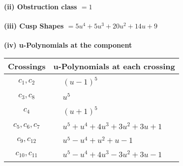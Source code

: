 \documentclass[1p]{elsarticle_modified}
\theoremstyle{definition}
\begin{document}
\flushleft \textbf{(ii) Obstruction class $= 1$}\\~\\
\flushleft \textbf{(iii) Cusp Shapes $= 5 u^4+5 u^3+20 u^2+14 u+9$}\\~\\
\newpage\renewcommand{\arraystretch}{1}
\flushleft \textbf{(iv) u-Polynomials at the component}\newline \\
\begin{tabular}{m{50pt}|m{274pt}}
Crossings & \hspace{64pt}u-Polynomials at each crossing \\
\hline $$\begin{aligned}c_{1},c_{2}\end{aligned}$$&$\begin{aligned}
&(u-1)^5
\end{aligned}$\\
\hline $$\begin{aligned}c_{3},c_{8}\end{aligned}$$&$\begin{aligned}
&u^5
\end{aligned}$\\
\hline $$\begin{aligned}c_{4}\end{aligned}$$&$\begin{aligned}
&(u+1)^5
\end{aligned}$\\
\hline $$\begin{aligned}c_{5},c_{6},c_{7}\end{aligned}$$&$\begin{aligned}
&u^5+u^4+4 u^3+3 u^2+3 u+1
\end{aligned}$\\
\hline $$\begin{aligned}c_{9},c_{12}\end{aligned}$$&$\begin{aligned}
&u^5- u^4+u^2+u-1
\end{aligned}$\\
\hline $$\begin{aligned}c_{10},c_{11}\end{aligned}$$&$\begin{aligned}
&u^5- u^4+4 u^3-3 u^2+3 u-1
\end{aligned}$\\
\hline
\end{tabular}\\~\\
\end{document}
